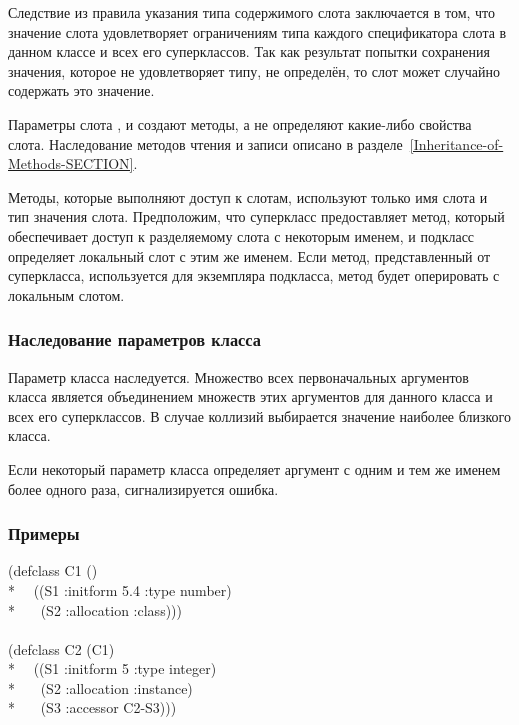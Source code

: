 Следствие из правила указания типа содержимого слота заключается в том, что
значение слота удовлетворяет ограничениям типа каждого спецификатора слота в
данном классе и всех его суперклассов. Так как результат попытки сохранения
значения, которое не удовлетворяет типу, не определён, то слот может случайно
содержать это значение.

Параметры слота ,  и  создают методы, а не
определяют какие-либо свойства слота.
Наследование методов чтения и записи описано в разделе~\ref{Inheritance-of-Methods-SECTION}.

Методы, которые выполняют доступ к слотам, используют только имя слота и тип
значения слота. Предположим, что суперкласс предоставляет метод, который
обеспечивает доступ к разделяемому слота с некоторым именем, и подкласс
определяет локальный слот с этим же именем. Если метод, представленный от
суперкласса, используется для экземпляра подкласса, метод будет оперировать с
локальным слотом.

\subsubsection{Наследование параметров класса}

Параметр класса  наследуется. Множество всех
первоначальных аргументов класса является объединением множеств этих аргументов
для данного класса и всех его суперклассов.
В случае коллизий выбирается значение наиболее близкого класса.

Если некоторый параметр класса  определяет аргумент с
одним и тем же именем более одного раза, сигнализируется ошибка.

\subsubsection{Примеры}

\begin{lisp}
(defclass C1 () \\*
~~((S1 :initform 5.4 :type number) \\*
~~~(S2 :allocation :class))) \\
\\
(defclass C2 (C1) \\*
~~((S1 :initform 5 :type integer)\\*
~~~(S2 :allocation :instance)\\*
~~~(S3 :accessor C2-S3)))
\end{lisp}

